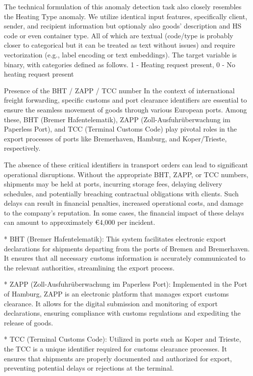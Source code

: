 The technical formulation of this anomaly detection task also closely resembles the Heating Type anomaly. We utilize identical input features, specifically client, sender, and recipient information but optionaly also goods' description and HS code or even container type. All of which are textual (code/type is probably closer to categorical but it can be treated as text without issues) and require vectorization (e.g., label encoding or text embeddings). The target variable is binary, with categories defined as follows. 1 - Heating request present, 0 - No heating request present

\sec Presence of the BHT / ZAPP / TCC number
In the context of international freight forwarding, specific customs and port clearance identifiers are essential to ensure the seamless movement of goods through various European ports. Among these, BHT (Bremer Hafentelematik), ZAPP (Zoll-Ausfuhrüberwachung im Paperless Port), and TCC (Terminal Customs Code) play pivotal roles in the export processes of ports like Bremerhaven, Hamburg, and Koper/Trieste, respectively.

The absence of these critical identifiers in transport orders can lead to significant operational disruptions. Without the appropriate BHT, ZAPP, or TCC numbers, shipments may be held at ports, incurring storage fees, delaying delivery schedules, and potentially breaching contractual obligations with clients. Such delays can result in financial penalties, increased operational costs, and damage to the company's reputation. In some cases, the financial impact of these delays can amount to approximately €4,000 per incident.

\begitems
* BHT (Bremer Hafentelematik): This system facilitates electronic export declarations for shipments departing from the ports of Bremen and Bremerhaven. It ensures that all necessary customs information is accurately communicated to the relevant authorities, streamlining the export process. 

* ZAPP (Zoll-Ausfuhrüberwachung im Paperless Port): Implemented in the Port of Hamburg, ZAPP is an electronic platform that manages export customs clearance. It allows for the digital submission and monitoring of export declarations, ensuring compliance with customs regulations and expediting the release of goods. 

* TCC (Terminal Customs Code): Utilized in ports such as Koper and Trieste, the TCC is a unique identifier required for customs clearance processes. It ensures that shipments are properly documented and authorized for export, preventing potential delays or rejections at the terminal. 
\enditems

